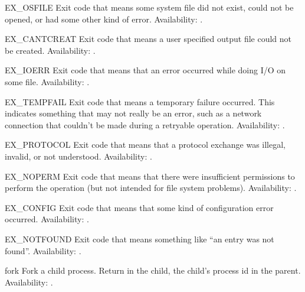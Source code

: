 \begin{datadesc}{EX_OSFILE}
Exit code that means some system file did not exist, could not be
opened, or had some other kind of error.
Availability: \UNIX.
\end{datadesc}

\begin{datadesc}{EX_CANTCREAT}
Exit code that means a user specified output file could not be created.
Availability: \UNIX.
\end{datadesc}

\begin{datadesc}{EX_IOERR}
Exit code that means that an error occurred while doing I/O on some file.
Availability: \UNIX.
\end{datadesc}

\begin{datadesc}{EX_TEMPFAIL}
Exit code that means a temporary failure occurred.  This indicates
something that may not really be an error, such as a network
connection that couldn't be made during a retryable operation.
Availability: \UNIX.
\end{datadesc}

\begin{datadesc}{EX_PROTOCOL}
Exit code that means that a protocol exchange was illegal, invalid, or
not understood.
Availability: \UNIX.
\end{datadesc}

\begin{datadesc}{EX_NOPERM}
Exit code that means that there were insufficient permissions to
perform the operation (but not intended for file system problems).
Availability: \UNIX.
\end{datadesc}

\begin{datadesc}{EX_CONFIG}
Exit code that means that some kind of configuration error occurred.
Availability: \UNIX.
\end{datadesc}

\begin{datadesc}{EX_NOTFOUND}
Exit code that means something like ``an entry was not found''.
Availability: \UNIX.
\end{datadesc}

\begin{funcdesc}{fork}{}
Fork a child process.  Return  in the child, the child's
process id in the parent.
Availability: \UNIX.
\end{funcdesc}

